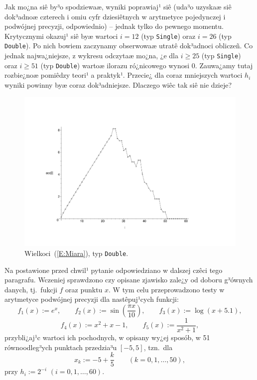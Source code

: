 \documentclass[11pt,leqno]{article}
\newcommand{\eqref}[1]{{\rm (\ref{#1})}}
\begin{document}
\label{S:Obser}
Jak mo¿na siê by³o spodziewaæ, wyniki poprawiaj¹ siê (uda³o uzyskaæ siê
dok³adnoæ czterech i omiu cyfr dziesiêtnych w arytmetyce pojedynczej 
i podwójnej precyzji, odpowiednio) -- jednak tylko do pewnego momentu. 
Krytycznymi okazuj¹ siê byæ wartoci $i=12$ (typ \texttt{Single}) oraz $i=26$
(typ \texttt{Double}). Po nich bowiem zaczynamy obserwowaæ utratê dok³adnoci
obliczeñ. Co jednak najwa¿niejsze, z wykresu odczytaæ mo¿na, ¿e dla $i\geq25$
(typ \texttt{Single}) oraz $i\geq51$ (typ \texttt{Double}) wartoæ ilorazu
ró¿nicowego wynosi $0$. Zauwa¿amy tutaj rozbie¿noæ pomiêdzy teori¹ a praktyk¹.
Przecie¿ dla coraz mniejszych wartoci $h_i$ wyniki powinny byæ coraz
dok³adniejsze. Dlaczego wiêc tak siê nie dzieje? 

\begin{center}
\begin{figure}[!h]
\begin{center}
\vspace{-2cm}
\hspace{0.75cm}
\includegraphics[scale=0.5,angle=0]{wyk2.pdf}
\vspace{-1.5cm}
\caption{Wielkoci~\eqref{E:Miara}, typ \texttt{Double}.}\label{W:Wyk2}
\end{center}
\end{figure}
\end{center}

Na postawione przed chwil¹ pytanie odpowiedziano w dalszej czêci tego
paragrafu. Wczeniej sprawdzono czy opisane zjawisko zale¿y od doboru g³ównych
danych, tj.~fukcji $f$ oraz punktu $x$. W tym celu przeprowadzono testy 
w arytmetyce podwójnej precyzji dla nastêpuj¹cych funkcji:
$$
f_1(x):=e^x,\qquad f_2(x):=\sin\left(\frac{\pi x}{10}\right),\qquad 
f_3(x):=\log{(x+5.1)},
$$
$$
f_4(x):=x^2+x-1,\qquad f_5(x):=\frac{1}{x^2+1},
$$
przybli¿aj¹c wartoci ich pochodnych, w opisany wy¿ej sposób, w 51
równoodleg³ych punktach przedzia³u $[-5,5]$, tzn.~dla
$$
x_k:=-5+\frac{k}{5}\qquad (k=0,1,\ldots,50),
$$
przy $h_i:=2^{-i}$ $(i=0,1,\ldots,60)$.
\end{document}
